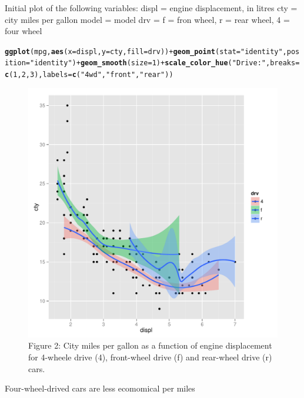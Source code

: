 \documentclass{article}\usepackage[]{graphicx}\usepackage[]{color}
\makeatletter
\def\maxwidth{ %
  \ifdim\Gin@nat@width>\linewidth
    \linewidth
  \else
    \Gin@nat@width
  \fi
}
\newcommand{\hlnum}[1]{\textcolor[rgb]{0.686,0.059,0.569}{#1}}%
\newcommand{\hlstr}[1]{\textcolor[rgb]{0.192,0.494,0.8}{#1}}%
\newcommand{\hlopt}[1]{\textcolor[rgb]{0,0,0}{#1}}%
\newcommand{\hlstd}[1]{\textcolor[rgb]{0.345,0.345,0.345}{#1}}%
\newcommand{\hlkwc}[1]{\textcolor[rgb]{0.333,0.667,0.333}{#1}}%
\newcommand{\hlkwd}[1]{\textcolor[rgb]{0.737,0.353,0.396}{\textbf{#1}}}%
\newenvironment{kframe}{%
 \def\at@end@of@kframe{}%
 \ifinner\ifhmode%
  \def\at@end@of@kframe{\end{minipage}}%
  \begin{minipage}{\columnwidth}%
 \fi\fi%
 \def\FrameCommand##1{\hskip\@totalleftmargin \hskip-\fboxsep
 \colorbox{shadecolor}{##1}\hskip-\fboxsep
     \hskip-\linewidth \hskip-\@totalleftmargin \hskip\columnwidth}%
 \MakeFramed {\advance\hsize-\width
   \@totalleftmargin\z@ \linewidth\hsize
   \@setminipage}}%
 {\par\unskip\endMakeFramed%
 \at@end@of@kframe}
\newenvironment{knitrout}{}{} %
\makeatother
\begin{document}
Initial plot of the following variables:
displ = engine displacement, in litres
cty = city miles per gallon
model = model
drv = f = fron wheel, r = rear wheel, 4 = four wheel
\begin{knitrout}
\color{fgcolor}\begin{kframe}
\begin{alltt}
\hlkwd{ggplot}\hlstd{(mpg,}\hlkwd{aes}\hlstd{(}\hlkwc{x}\hlstd{=displ,}\hlkwc{y}\hlstd{=cty,}\hlkwc{fill}\hlstd{=drv))}\hlopt{+}\hlkwd{geom_point}\hlstd{(}\hlkwc{stat}\hlstd{=}\hlstr{"identity"}\hlstd{,}\hlkwc{position}\hlstd{=}\hlstr{"identity"}\hlstd{)}\hlopt{+}\hlkwd{geom_smooth}\hlstd{(}\hlkwc{size}\hlstd{=}\hlnum{1}\hlstd{)}\hlopt{+}\hlkwd{scale_color_hue}\hlstd{(}\hlstr{"Drive:"}\hlstd{,} \hlkwc{breaks}\hlstd{=}\hlkwd{c}\hlstd{(}\hlnum{1}\hlstd{,}\hlnum{2}\hlstd{,}\hlnum{3}\hlstd{),}\hlkwc{labels}\hlstd{=}\hlkwd{c}\hlstd{(}\hlstr{"4wd"}\hlstd{,}\hlstr{"front"}\hlstd{,}\hlstr{"rear"}\hlstd{))}
\end{alltt}


{\ttfamily\noindent\itshape{}}\end{kframe}\begin{figure}
\includegraphics[width=\maxwidth]{figure/plot02-1} \caption[Figure 2]{Figure 2: City miles per gallon as a function of engine displacement for 4-wheele drive (4), front-wheel drive (f) and rear-wheel drive (r) cars.}\label{fig:plot02}
\end{figure}


\end{knitrout}

Four-wheel-drived cars are less ecomomical per miles
\end{document}
